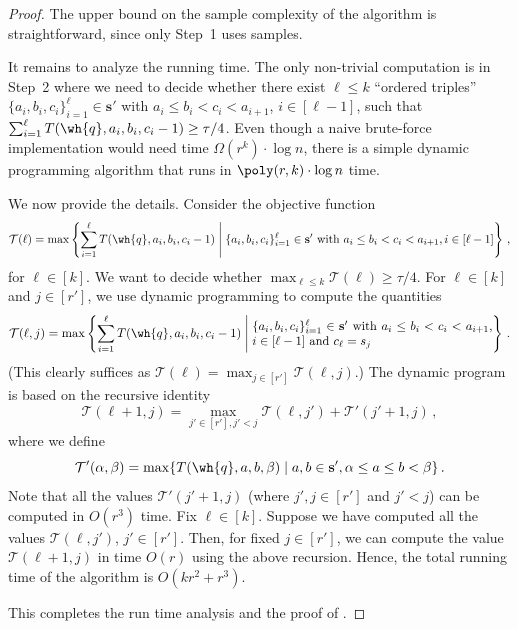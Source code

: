 \begin{proof}
The upper bound on the sample complexity of the algorithm is straightforward, since
only Step~1 uses samples. 

 {It remains to analyze the running time. The only non-trivial computation is in Step~2 where we need to decide whether 
there exist $\ell \le k$ ``ordered triples'' $\{a_i, b_i, c_i\}_{i=1}^{\ell} \in  \mathbf{s}'$ with $a_i \le b_i < c_i < a_{i+1}$, $i \in [\ell-1]$,
such that $\sum_{i=1}^{\ell} T(\wh{q}, a_i, b_i, c_i-1) \ge \tau/4$.
Even though a naive brute-force implementation would need time $\Omega(r^k) \cdot \log n$, 
there is a simple dynamic programming algorithm that runs in $\poly(r, k) \cdot \log n$
time.

We now provide the details. Consider the objective function
$$\mathcal{T}(\ell) = \max \left\{ \sum_{i=1}^{\ell} T(\wh{q}, a_i, b_i, c_i-1) \;\middle|\; 
\{a_i, b_i, c_i\}_{i=1}^{\ell} \in \mathbf{s}'  \textrm{ with } a_i \le b_i < c_i < a_{i+1}, i \in [\ell-1] \right\}\,,$$
for $\ell \in [k]$. We want to decide whether $\max_{\ell \le k}\mathcal{T}(\ell) \ge \tau/4$. 
%
For $\ell \in [k]$ and $j \in [r']$, we use dynamic programming to compute the quantities 
$$\mathcal{T}(\ell, j) = \max \left\{ \sum_{i=1}^{\ell} T(\wh{q}, a_i,
  b_i, c_i-1) \;\middle|\; \parbox{68mm}{$\{a_i, b_i,
      c_i\}_{i=1}^{\ell} \in \mathbf{s}'$ with $a_i \le b_i < c_i < a_{i+1}$, $i \in [\ell-1]$ and $c_{\ell} = s_j$} \right\}\,.$$
(This clearly suffices as $\mathcal{T}(\ell) = \max_{j \in [r']} \mathcal{T}(\ell, j)$.)
The dynamic program is based on the recursive identity 
$$\mathcal{T}(\ell+1, j) = \max_{j' \in [r'],  j'<j}\mathcal{T}(\ell, j') +  \mathcal{T}'(j'+1, j)\,,$$
where we define 
\[
\mathcal{T}'(\alpha,\beta)  =  \max \{ T(\wh{q}, a, b, \beta) \mid  a,b \in \mathbf{s}', 
\alpha \leq a \leq b < \beta \}\,.
\]
Note that all the values $\mathcal{T}'(j'+1,j)$ (where $j',j \in [r']$ and $j'<j$) can be computed in $O(r^3)$ time. Fix $\ell \in [k]$. Suppose we have computed all
the values $\mathcal{T}(\ell, j')$, $j' \in [r']$. Then, for fixed $j \in [r']$, we can compute the value $\mathcal{T}(\ell+1, j)$ in time $O(r)$ 
using the above recursion. Hence, the total running time of the algorithm is $O(kr^2+r^3)$.
}
\noindent This completes the run time analysis and the proof of .
\end{proof}
